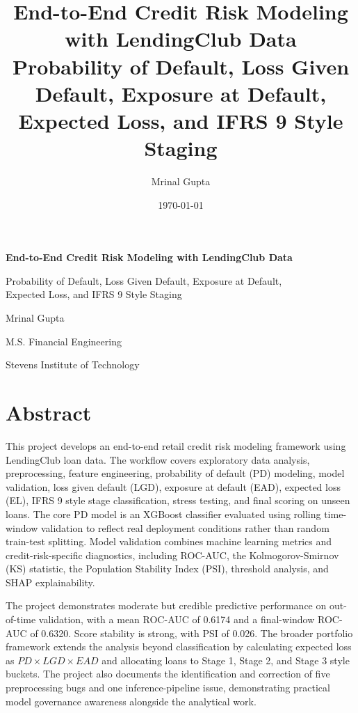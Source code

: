 \documentclass[12pt]{article}
\title{\textbf{End-to-End Credit Risk Modeling with LendingClub Data}\\
\large Probability of Default, Loss Given Default, Exposure at Default,\\ Expected Loss, and IFRS 9 Style Staging}
\author{Mrinal Gupta}
\date{\today}
\begin{document}
\begin{titlepage}
    \centering
    \vspace*{2.5cm}
    {\huge \textbf{End-to-End Credit Risk Modeling with LendingClub Data}\par}
    \vspace{0.7cm}
    {\Large Probability of Default, Loss Given Default, Exposure at Default,\\ Expected Loss, and IFRS 9 Style Staging\par}
    \vspace{2cm}
    {\large Mrinal Gupta\par}
    \vspace{0.3cm}
    {\large M.S. Financial Engineering\par}
    {\large Stevens Institute of Technology\par}
    \vfill
\end{titlepage}

\tableofcontents
\newpage
{}

\section{Abstract}

This project develops an end-to-end retail credit risk modeling framework using LendingClub loan data. The workflow covers exploratory data analysis, preprocessing, feature engineering, probability of default (PD) modeling, model validation, loss given default (LGD), exposure at default (EAD), expected loss (EL), IFRS 9 style stage classification, stress testing, and final scoring on unseen loans. The core PD model is an XGBoost classifier evaluated using rolling time-window validation to reflect real deployment conditions rather than random train-test splitting. Model validation combines machine learning metrics and credit-risk-specific diagnostics, including ROC-AUC, the Kolmogorov-Smirnov (KS) statistic, the Population Stability Index (PSI), threshold analysis, and SHAP explainability.

The project demonstrates moderate but credible predictive performance on out-of-time validation, with a mean ROC-AUC of 0.6174 and a final-window ROC-AUC of 0.6320. Score stability is strong, with PSI of 0.026. The broader portfolio framework extends the analysis beyond classification by calculating expected loss as $PD \times LGD \times EAD$ and allocating loans to Stage 1, Stage 2, and Stage 3 style buckets. The project also documents the identification and correction of five preprocessing bugs and one inference-pipeline issue, demonstrating practical model governance awareness alongside the analytical work.
\end{document}
